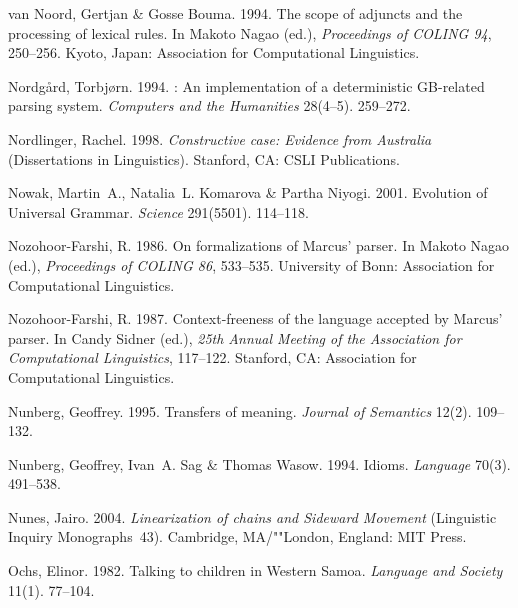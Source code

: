 \begin{thebibliography}{1420}
van Noord, Gertjan \& Gosse Bouma. 1994.
\newblock The scope of adjuncts and the processing of lexical rules.
\newblock In Makoto Nagao (ed.), \emph{Proceedings of {COLING} 94}, 250--256.
  Kyoto, Japan: Association for Computational Linguistics.

Nordg{\r{a}}rd, Torbj{\o}rn. 1994.
: {An} implementation of a deterministic {GB}-related
  parsing system.
\newblock \emph{Computers and the Humanities} 28(4--5). 259--272.

Nordlinger, Rachel. 1998.
\newblock \emph{Constructive case: {Evidence} from {Australia}}  (Dissertations
  in Linguistics).
\newblock Stanford, CA: CSLI Publications.

Nowak, Martin~A., Natalia~L. Komarova \& Partha Niyogi. 2001.
\newblock Evolution of {Universal Grammar}.
\newblock \emph{Science} 291(5501). 114--118.

Nozohoor-Farshi, R. 1986.
\newblock On formalizations of {Marcus'} parser.
\newblock In Makoto Nagao (ed.), \emph{Proceedings of {COLING} 86}, 533--535.
  University of Bonn: Association for Computational Linguistics.

Nozohoor-Farshi, R. 1987.
\newblock Context-freeness of the language accepted by {Marcus'} parser.
\newblock In Candy Sidner (ed.), \emph{25th {Annual Meeting of the Association
  for Computational Linguistics}}, 117--122. Stanford, CA: Association for
  Computational Linguistics.

Nunberg, Geoffrey. 1995.
\newblock Transfers of meaning.
\newblock \emph{Journal of Semantics} 12(2). 109--132.

Nunberg, Geoffrey, Ivan~A. Sag \& Thomas Wasow. 1994.
\newblock Idioms.
\newblock \emph{Language} 70(3). 491--538.

Nunes, Jairo. 2004.
\newblock \emph{Linearization of chains and {Sideward Movement}} (Linguistic
  Inquiry Monographs~43).
\newblock Cambridge, MA/""London, England: MIT Press.

Ochs, Elinor. 1982.
\newblock Talking to children in {Western Samoa}.
\newblock \emph{Language and Society} 11(1). 77--104.


\end{thebibliography}
